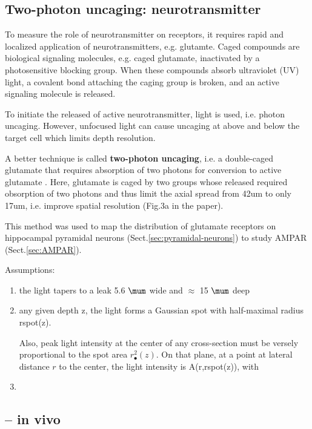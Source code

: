 \subsection{Two-photon uncaging: neurotransmitter}
\label{sec:two-photon-uncaging}

To measure the role of neurotransmitter on receptors, it requires rapid and
localized application of neurotransmitters, e.g. glutamte.
Caged compounds are biological signaling molecules, e.g. caged glutamate,
inactivated by a photosensitive blocking group.
When these compounds absorb ultraviolet (UV) light, a covalent bond attaching
the caging group is broken, and an active signaling molecule is released.


To initiate the released of active neurotransmitter, light is used, i.e.
photon uncaging. However,  unfocused light can cause uncaging at above and below
the target cell which limits depth resolution.

A better technique is called {\bf two-photon uncaging}, i.e. a double-caged
glutamate that requires absorption of two photons for conversion to active
glutamate \citep{pettite1997}. Here, glutamate is caged by two groups whose
released required obsorption of two photons and thus limit the axial spread from
42um to only 17um, i.e. improve spatial resolution (Fig.3a in the paper).

This method was used to map the distribution of glutamate receptors on hippocampal pyramidal neurons
(Sect.\ref{sec:pyramidal-neurons}) to study AMPAR (Sect.\ref{sec:AMPAR}).

Assumptions:
\begin{enumerate}
  \item the light tapers to a leak 5.6 $\mum$ wide and $\approx$ 15 $\mum$ deep

  \item   any given depth z, the light forms a Gaussian spot with half-maximal
  radius rspot(z).

  Also, peak light intensity at the center of any cross-section must
  be versely proportional to the spot area $r^2_\spot(z)$. On that plane, at a
  point at lateral distance $r$ to the center, the light intensity
  is A(r,rspot(z)), with

  \item
\end{enumerate}

\subsection{ -- in vivo}

